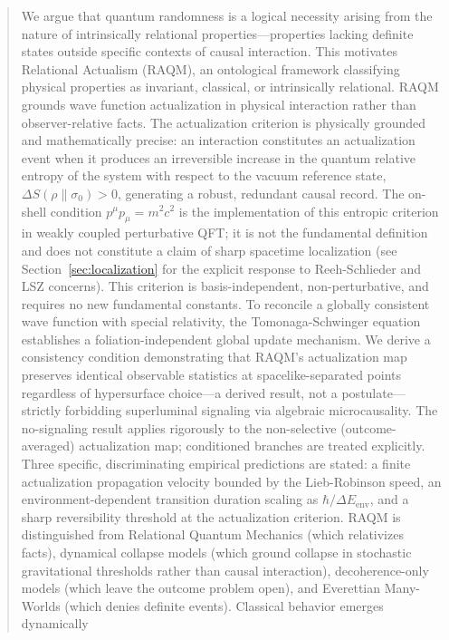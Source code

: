 \documentclass[11pt,a4paper]{article}
\theoremstyle{plain}
\theoremstyle{definition}
\theoremstyle{remark}
\begin{document}
\begin{abstract}
We argue that quantum randomness is a logical necessity arising from the nature of
intrinsically relational properties---properties lacking definite states outside
specific contexts of causal interaction. This motivates Relational Actualism
(RAQM), an ontological framework classifying physical properties as invariant,
classical, or intrinsically relational. RAQM grounds wave function actualization
in physical interaction rather than observer-relative facts. The actualization
criterion is physically grounded and mathematically precise: an interaction
constitutes an actualization event when it produces an irreversible increase in
the quantum relative entropy of the system with respect to the vacuum reference
state, $\Delta S(\rho\|\sigma_0) > 0$, generating a robust, redundant causal
record. The on-shell condition $p^{\mu}p_{\mu} = m^{2}c^{2}$ is the
implementation of this entropic criterion in weakly coupled perturbative QFT;
it is not the fundamental definition and does not constitute a claim of sharp
spacetime localization (see Section~\ref{sec:localization} for the explicit
response to Reeh-Schlieder and LSZ concerns).
This criterion is basis-independent, non-perturbative, and requires no new
fundamental constants. To reconcile a globally consistent wave function with
special relativity, the Tomonaga-Schwinger equation establishes a
foliation-independent global update mechanism. We derive a consistency condition
demonstrating that RAQM's actualization map preserves identical observable
statistics at spacelike-separated points regardless of hypersurface choice---a
derived result, not a postulate---strictly forbidding superluminal signaling via
algebraic microcausality. The no-signaling result applies rigorously to the
non-selective (outcome-averaged) actualization map; conditioned branches are
treated explicitly. Three specific, discriminating empirical predictions are
stated: a finite actualization propagation velocity bounded by the Lieb-Robinson
speed, an environment-dependent transition duration scaling as $\hbar/\Delta
E_{\mathrm{env}}$, and a sharp reversibility threshold at the actualization
criterion. RAQM is distinguished from Relational Quantum Mechanics (which
relativizes facts), dynamical collapse models (which ground collapse in
stochastic gravitational thresholds rather than causal interaction),
decoherence-only models (which leave the outcome problem open), and Everettian
Many-Worlds (which denies definite events). Classical behavior emerges dynamically

\end{abstract}
\end{document}
